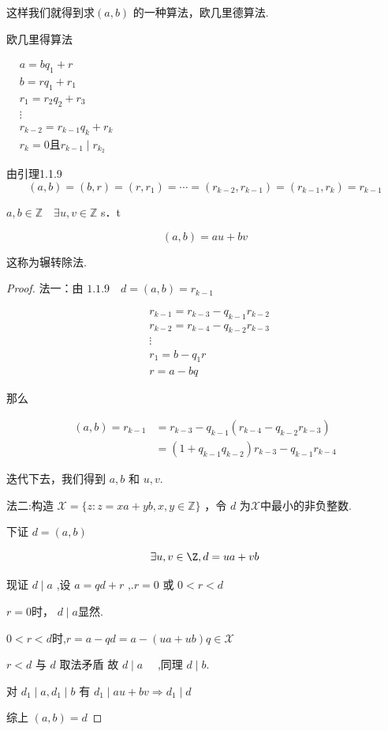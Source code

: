 这样我们就得到求$(a, b)$  的一种算法，欧几里德算法.


\begin{algo}欧几里得算法
	
	$\begin{aligned}
		& a=b q_1+r \\
		& b=r q_1+r_1 \\
		& r_1=r_2 q_2+r_3 \\
		& \vdots \\
		& r_{k-2}=r_{k-1} q_k+r_k\\
		&r_k=0\textbf{且}r_{k-1}\mid r_{k_2}
	\end{aligned}$
	
	由引理1.1.9
	$$(a, b)=(b, r)=\left(r, r_1\right)=\cdots=\left(r_{k-2}, r_{k-1}\right)=\left(r_{k-1}, r_k\right)=r_{k-1}$$
\end{algo}
\begin{definition}
	$a, b \in \mathbb{Z} \quad \exists u, v \in \mathbb{Z}$ s．t
	
	$$
	(a, b)=a u+b v
	$$
	
	
	
\end{definition}
这称为辗转除法.
\begin{proof}
	法一：由 $1.1.9 \quad d=(a, b)=r_{k-1}$
	
	$$
	\begin{aligned}
		& r_{k-1}=r_{k-3}-q_{k-1} r_{k-2} \\
		& r_{k-2}=r_{k-4}-q_{k-2} r_{k-3}\\
		&\vdots\\
		& r_1=b-q_1 r \\
		& r=a-b q
	\end{aligned}
	$$
	
	
	那么
	
	$$
	\begin{aligned}
		(a, b)=r_{k-1} & =r_{k-3}-q_{k-1}\left(r_{k-4}-q_{k-2} r_{k-3}\right) \\
		& =\left(1+q_{k-1} q_{k-2}\right) r_{k-3}-q_{k-1} r_{k-4}
	\end{aligned}
	$$
	
	
	迭代下去，我们得到 $a, b$ 和 $u, v$.
	
	法二:构造 $\mathcal{X}=\{z: z=x a+y b,  x,  y \in \mathbb{Z}\}$ ，令 $d$ 为$\mathcal{X}$中最小的非负整数.
	
	下证 $d=(a, b)$
	
	$$\exists u,v\in\Z,
	d=u a+v b
	$$
	
	
	现证 $d \mid a$ ,设 $a=q d+r $ ,.$ r=0$ 或 $0<r<d $
	
	$r=0$时， $d\mid a$显然.
	
	
	$0<r<d \textbf{时,} r=a-q d=a-(u a+u b) q \in \mathcal{X}$
	
	$r<d$ 与 $d$ 取法矛盾 故 $d \mid a \quad$ ,同理 $d \mid b$.
	
	对 $d_1\mid a, d_1\mid b$ 有 $d_1\mid a u+b v \Rightarrow d_1\mid d$
	
	综上 $(a, b)=d$
\end{proof}

